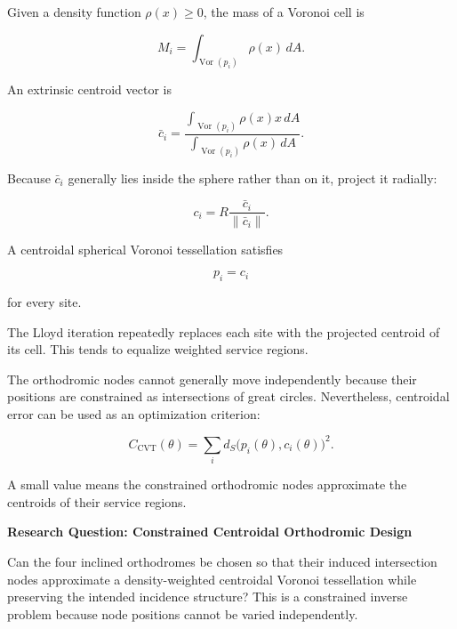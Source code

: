 \documentclass[11pt,fleqn]{book}
\numberwithin{equation}{chapter}
\newenvironment{research}[1]
  {\begin{researchEnv}
   \noindent\textbf{Research Question: #1}\par\smallskip}
  {\end{researchEnv}}
\theoremstyle{plain}
\theoremstyle{definition}
\theoremstyle{remark}
\newcommand{\Vor}{\operatorname{Vor}}
\begin{document}
Given a density function \(\rho(x)\geq 0\), the mass of a Voronoi cell is

\begin{equation}
    M_i
    =
    \int_{\Vor(p_i)}
    \rho(x)\,dA.
\end{equation}

An extrinsic centroid vector is

\begin{equation}
    \bar c_i
    =
    \frac{
      \int_{\Vor(p_i)}
      \rho(x)x\,dA
    }{
      \int_{\Vor(p_i)}
      \rho(x)\,dA
    }.
\end{equation}

Because \(\bar c_i\) generally lies inside the sphere rather than on it, project it radially:

\begin{equation}
    c_i
    =
    R\frac{\bar c_i}{\|\bar c_i\|}.
\end{equation}

A centroidal spherical Voronoi tessellation satisfies

\begin{equation}
    p_i=c_i
\end{equation}

for every site.

The Lloyd iteration repeatedly replaces each site with the projected centroid of its cell. This tends to equalize weighted service regions.

The orthodromic nodes cannot generally move independently because their positions are constrained as intersections of great circles. Nevertheless, centroidal error can be used as an optimization criterion:

\begin{equation}
    C_{\mathrm{CVT}}(\theta)
    =
    \sum_i
    d_S\bigl(p_i(\theta),c_i(\theta)\bigr)^2.
\end{equation}

A small value means the constrained orthodromic nodes approximate the centroids of their service regions.

\begin{research}{Constrained Centroidal Orthodromic Design}
Can the four inclined orthodromes be chosen so that their induced intersection nodes approximate a density-weighted centroidal Voronoi tessellation while preserving the intended incidence structure? This is a constrained inverse problem because node positions cannot be varied independently.
\end{research}
\end{document}
